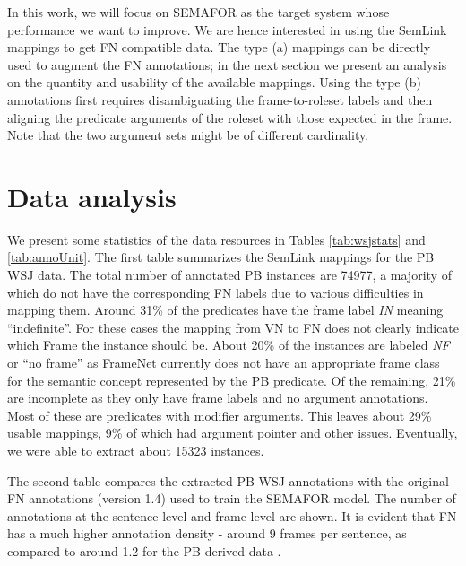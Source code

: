 \documentclass[11pt]{article}
\begin{document}
In this work, we will focus on SEMAFOR as the target system whose performance we want to improve. We are hence interested in using the SemLink mappings to get FN compatible data. The type (a) mappings can be directly used to augment the FN annotations; in the next section we present an analysis on the quantity and usability of the available mappings. Using the type (b) annotations first requires disambiguating the frame-to-roleset labels and then aligning the predicate arguments of the roleset with those expected in the frame. Note that the two argument sets might be of different cardinality.

\section{Data analysis}
We present some statistics of the data resources in Tables \ref{tab:wsjstats} and \ref{tab:annoUnit}. The first table summarizes the SemLink mappings for the PB WSJ data. The total number of annotated PB instances are 74977, a majority of which do not have the corresponding FN labels due to various difficulties in mapping them. Around 31\% of the predicates have the frame label \textit{IN} meaning ``indefinite''. For these cases the mapping from VN to FN does not clearly indicate which Frame the instance should be. About 20\% of the instances are labeled \textit{NF} or ``no frame'' as FrameNet currently does not have an appropriate frame class for the semantic concept represented by the PB predicate. Of the remaining, 21\% are incomplete as they only have frame labels and no argument annotations. Most of these are predicates with modifier arguments. This leaves about 29\% usable mappings, 9\% of which had argument pointer and other issues. Eventually, we were able to extract about 15323 instances.

The second table compares the extracted PB-WSJ annotations with the original FN annotations (version 1.4) used to train the SEMAFOR model. The number of annotations at the sentence-level and frame-level are shown. It is evident that FN has a much higher annotation density - around 9 frames per sentence, as compared to around 1.2 for the PB derived data .
\end{document}
